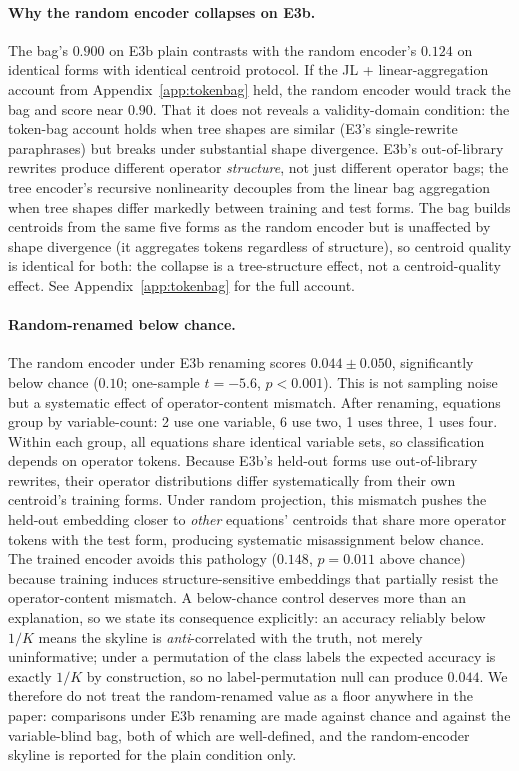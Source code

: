 \paragraph{Why the random encoder collapses on E3b.} The bag's $0.900$ on E3b plain contrasts with the random encoder's $0.124$ on identical forms with identical centroid protocol. If the JL + linear-aggregation account from Appendix~\ref{app:tokenbag} held, the random encoder would track the bag and score near $0.90$. That it does not reveals a validity-domain condition: the token-bag account holds when tree shapes are similar (E3's single-rewrite paraphrases) but breaks under substantial shape divergence. E3b's out-of-library rewrites produce different operator \emph{structure}, not just different operator bags; the tree encoder's recursive nonlinearity decouples from the linear bag aggregation when tree shapes differ markedly between training and test forms. The bag builds centroids from the same five forms as the random encoder but is unaffected by shape divergence (it aggregates tokens regardless of structure), so centroid quality is identical for both: the collapse is a tree-structure effect, not a centroid-quality effect. See Appendix~\ref{app:tokenbag} for the full account.

\paragraph{Random-renamed below chance.} The random encoder under E3b renaming scores $0.044 \pm 0.050$, significantly below chance ($0.10$; one-sample $t{=}-5.6$, $p{<}0.001$). This is not sampling noise but a systematic effect of operator-content mismatch. After renaming, equations group by variable-count: 2 use one variable, 6 use two, 1 uses three, 1 uses four. Within each group, all equations share identical variable sets, so classification depends on operator tokens. Because E3b's held-out forms use out-of-library rewrites, their operator distributions differ systematically from their own centroid's training forms. Under random projection, this mismatch pushes the held-out embedding closer to \emph{other} equations' centroids that share more operator tokens with the test form, producing systematic misassignment below chance. The trained encoder avoids this pathology ($0.148$, $p{=}0.011$ above chance) because training induces structure-sensitive embeddings that partially resist the operator-content mismatch. A below-chance control deserves more than an explanation, so we state its consequence explicitly: an accuracy reliably below $1/K$ means the skyline is \emph{anti}-correlated with the truth, not merely uninformative; under a permutation of the class labels the expected accuracy is exactly $1/K$ by construction, so no label-permutation null can produce $0.044$. We therefore do not treat the random-renamed value as a floor anywhere in the paper: comparisons under E3b renaming are made against chance and against the variable-blind bag, both of which are well-defined, and the random-encoder skyline is reported for the plain condition only.


